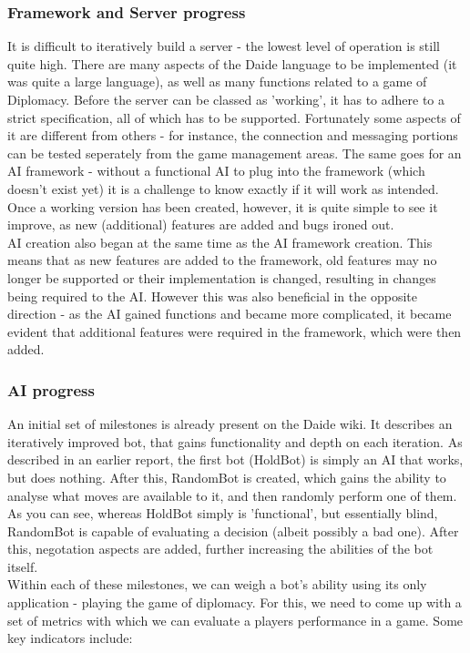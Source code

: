 \documentclass[11pt]{article}
\begin{document}
\subsubsection{Framework and Server progress}
It is difficult to iteratively build a server - the lowest level of operation is
still quite high. There are many aspects of the Daide language to be implemented
(it was quite a large language), as well as many functions related to a game of
Diplomacy. Before the server can be classed as 'working', it has to adhere to a
strict specification, all of which has to be supported. Fortunately some aspects
of it are different from others - for instance, the connection and messaging 
portions can be tested seperately from the game management areas. The same goes
for an AI framework - without a functional AI to plug into the framework (which 
doesn't exist yet) it is a challenge to know exactly if it will work as intended.
Once a working version has been created, however, it is quite simple to see it
improve, as new (additional) features are added and bugs ironed out.
\\
AI creation also began at the same time as the AI framework creation. This means
that as new features are added to the framework, old features may no longer be
supported or their implementation is changed, resulting in changes being 
required to the AI. However this was also beneficial in the opposite direction
- as the AI gained functions and became more complicated, it became evident that
additional features were required in the framework, which were then added.

\subsubsection{AI progress}
An initial set of milestones is already present on the Daide wiki. It describes 
an iteratively improved bot, that gains functionality and depth on each iteration.
As described in an earlier report, the first bot (HoldBot) is simply an AI that
works, but does nothing. After this, RandomBot is created, which gains the
ability to analyse what moves are available to it, and then randomly perform one
of them. As you can see, whereas HoldBot simply is 'functional', but essentially
blind, RandomBot is capable of evaluating a decision (albeit possibly a bad one).
After this, negotation aspects are added, further increasing the abilities of
the bot itself. 
\\
Within each of these milestones, we can weigh a bot's ability using its only 
application - playing the game of diplomacy. For this, we need to come up with
a set of metrics with which we can evaluate a players performance in a game.
Some key indicators include:
\end{document}
